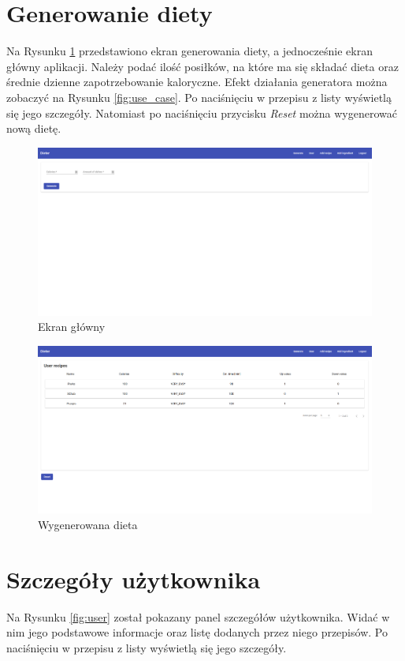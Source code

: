 \section{Generowanie diety}
Na Rysunku \ref{fig:main} przedstawiono ekran generowania diety, a jednocześnie ekran główny aplikacji. Należy podać ilość posiłków, na które ma się składać dieta oraz średnie dzienne zapotrzebowanie kaloryczne. Efekt działania generatora można zobaczyć na Rysunku \ref{fig:use_case}. Po naciśnięciu w przepisu z listy wyświetlą się jego szczegóły. Natomiast po naciśnięciu przycisku \textit{Reset} można wygenerować nową dietę.

\begin{figure}[H]
\includegraphics[width=\textwidth]{screeny/main.png}
\caption{Ekran główny}
\label{fig:main}
\end{figure}

\begin{figure}[H]
\includegraphics[width=\textwidth]{screeny/generowany.png}
\caption{Wygenerowana dieta}
\label{fig:generowana_dieta}
\end{figure}

\section{Szczegóły użytkownika}
Na Rysunku \ref{fig:user} został pokazany panel szczegółów użytkownika. Widać w nim jego podstawowe informacje oraz listę dodanych przez niego przepisów. Po naciśnięciu w przepisu z listy wyświetlą się jego szczegóły.

